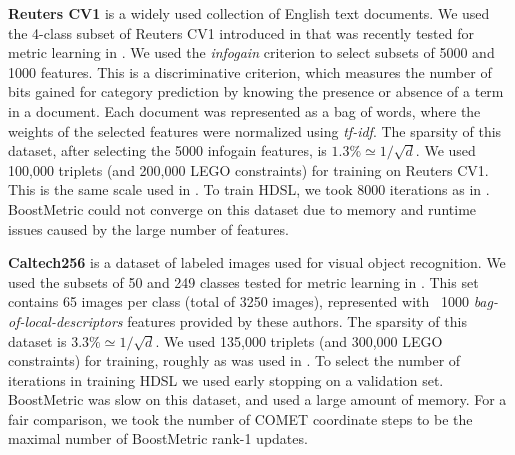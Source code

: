 \documentclass[twoside,11pt]{article}
\begin{document}
\textbf{Reuters CV1} is a widely used collection of English text documents. We used the 4-class subset of Reuters CV1 introduced in \citep{CaiRCV14} that was recently tested for metric learning in \citep{HDSL}. We used the \textit{infogain} criterion \citep{infogain} to select subsets of 5000 and 1000 features. This is a discriminative criterion, which measures the number of bits gained for category prediction by knowing the presence or absence of a term in a document. Each document was represented as a bag of words, where the weights of the selected features were normalized using \textit{tf-idf}. The sparsity of this dataset, after selecting the 5000 infogain features, is $1.3\% \simeq 1/\sqrt{d}$. We used 100,000 triplets (and 200,000 LEGO constraints) for training on Reuters CV1. This is the same scale used in \citet{HDSL}. To train HDSL, we took 8000 iterations as in \citep{HDSL}. BoostMetric could not converge on this dataset due to memory and runtime issues caused by the large number of features.

\textbf{Caltech256} is a dataset of labeled images used for visual object recognition. We used the subsets of 50 and 249 classes tested for metric learning in \citep{OASIS}. This set contains 65 images per class (total of 3250 images), represented with ~1000 \textit{bag-of-local-descriptors} features provided by these authors. The sparsity of this dataset is $3.3\% \simeq 1/\sqrt{d}$. We used 135,000 triplets (and 300,000 LEGO constraints) for training, roughly as was used in \citep{OASIS}. To select the number of iterations in training HDSL we used early stopping on a validation set. BoostMetric was slow on this dataset, and used a large amount of memory. For a fair comparison, we took the number of COMET coordinate steps to be the maximal number of BoostMetric rank-1 updates.
\end{document}
